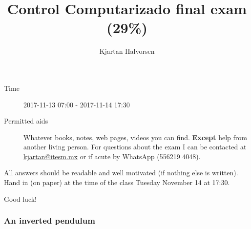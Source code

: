 \documentclass[letterpaper,12pt]{article}
\title{Control Computarizado final exam (29\%)}
\author{Kjartan Halvorsen}
\begin{document}
\maketitle


\begin{description}
\item[Time] 2017-11-13 07:00 - 2017-11-14 17:30
\item[Permitted aids] Whatever books, notes, web pages, videos you can find. \textbf{Except} help from another living person. For questions about the exam I can be contacted at \url{kjartan@itesm.mx} or if acute by WhatsApp (556219 4048).
\end{description}

All answers should be readable and well motivated (if nothing else is written). Hand in (on paper) at the time of the class Tuesday November 14 at 17:30.

\begin{center}
{\Large Good luck!} \\
\end{center}



\subsubsection*{An inverted pendulum}
\end{document}

